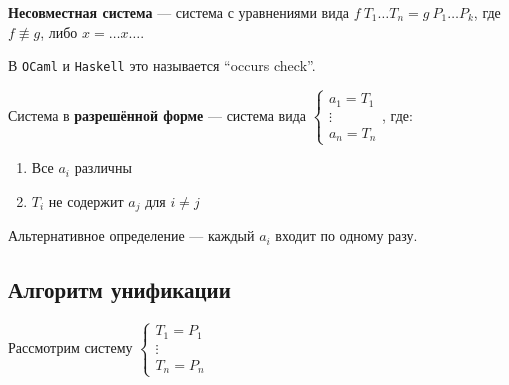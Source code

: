 \begin{definition}
    \textbf{Несовместная система} --- система с уравнениями вида \(f\ T_1 \dots T_n = g\ P_1 \dots P_k\), где \(f \not\equiv g\), либо \(x = \dots x \dots\).

    В \texttt{OCaml} и \texttt{Haskell} это называется ``occurs check''.
\end{definition}

\begin{definition}
    Система в \textbf{разрешённой форме} --- система вида \(\begin{cases}
        a_1 = T_1 \\
        \vdots    \\
        a_n = T_n
    \end{cases}\), где:
    \begin{enumerate}
        \item Все \(a_i\) различны
        \item \(T_i\) не содержит \(a_j\) для \(i \neq j\)
    \end{enumerate}

    Альтернативное определение --- каждый \(a_i\) входит по одному разу.
\end{definition}

\subsection{Алгоритм унификации}

Рассмотрим систему \(\begin{cases}
    T_1 = P_1 \\
    \vdots    \\
    T_n = P_n
\end{cases}\)

